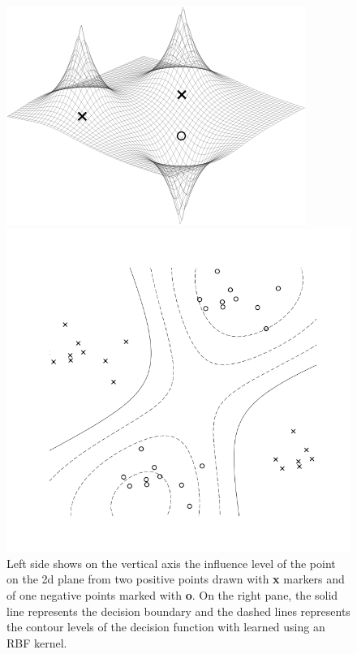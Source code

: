 \begin{figure}
  \begin{minipage}{.5\textwidth}
    \centering
    \includegraphics[width=\linewidth]{influence_map.png}
  \end{minipage}%
  \begin{minipage}{.5\textwidth}
    \centering
    \includegraphics[width=\linewidth]{decision_boundary.png}
  \end{minipage}
  \caption{
    Left side shows on the vertical axis the influence level of the point on the 2d plane from two positive points drawn  with \textbf{x} markers and of one negative points marked with \textbf{o}. On the right pane, the solid line represents the decision boundary and the dashed lines represents the contour levels of the decision function with learned using an RBF kernel.
  }
\end{figure}

